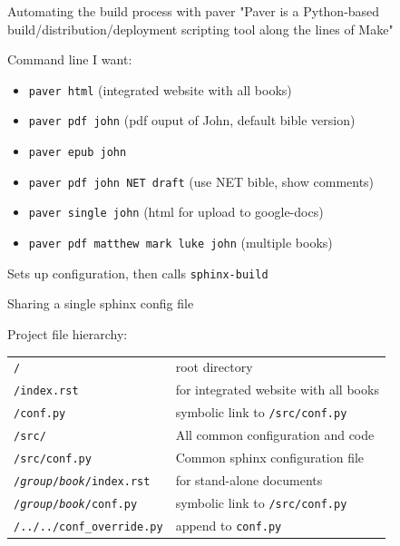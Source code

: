 \documentclass{beamer}
\begin{document}
\begin{frame}{Automating the build process with paver}
"Paver is a Python-based build/distribution/deployment 
scripting tool along the lines of Make"

Command line I want:
\begin{itemize}
\item \texttt{paver html} (integrated website with all books)
\item \texttt{paver pdf john} (pdf ouput of John, default bible version)
\item \texttt{paver epub john}
\item \texttt{paver pdf john NET draft} (use NET bible, show comments)
\item \texttt{paver single john} (html for upload to google-docs)
\item \texttt{paver pdf matthew mark luke john} (multiple books)
\end{itemize}

Sets up configuration, then calls \texttt{sphinx-build}

\end{frame}

\begin{frame}[fragile]{Sharing a single sphinx config file}

Project file hierarchy:

\begin{tabular}{|l|l|}
\hline
\texttt{/} & root directory \\
\texttt{/index.rst} & for integrated website with all books \\
\texttt{/conf.py} & symbolic link to \texttt{/src/conf.py}\\
\hline
\texttt{/src/} & All common configuration and code\\
\texttt{/src/conf.py} & Common sphinx configuration file\\
\hline
\texttt{/\emph{group}/\emph{book}/index.rst} & for stand-alone documents\\
\texttt{/\emph{group}/\emph{book}/conf.py} & symbolic link to \texttt{/src/conf.py}\\
\texttt{/../../conf\_override.py} & append to \texttt{conf.py}\\
\hline
\end{tabular}


\end{frame}
\end{document}
